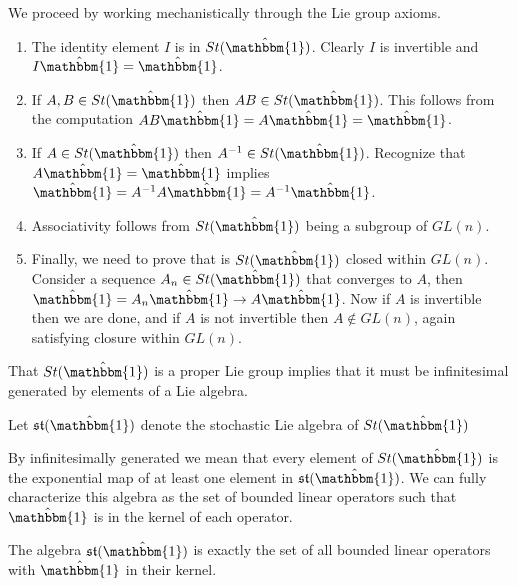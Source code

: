 \begin{IEEEproof}
	We proceed by working mechanistically through the Lie group axioms\cite{hall_lie_2004}.
	\begin{enumerate}
		\item The identity element $I$ is in $St(\hat{\mathbbm{1}})$. Clearly $I$ is
		invertible and $I \hat{\mathbbm{1}} = \hat{\mathbbm{1}}$.
		\item If $A,B \in St(\hat{\mathbbm{1}})$ then $AB \in St(\hat{\mathbbm{1}})$. 
		This follows from the computation $AB \hat{\mathbbm{1}} = A \hat{\mathbbm{1}} = \hat{\mathbbm{1}}$.
		\item If $A \in St(\hat{\mathbbm{1}})$ then $A^{-1} \in St(\hat{\mathbbm{1}})$.
		Recognize that $A \hat{\mathbbm{1}} = \hat{\mathbbm{1}}$ implies $\hat{\mathbbm{1}} = A^{-1} A \hat{\mathbbm{1}} = A^{-1} \hat{\mathbbm{1}}$.
		\item Associativity follows from $St(\hat{\mathbbm{1}})$ being a subgroup of $GL\left(n\right)$.
		\item Finally, we need to prove that is $St(\hat{\mathbbm{1}})$ closed 
		within $GL\left(n\right)$. Consider a sequence $A_n \in St(\hat{\mathbbm{1}})$ 
		that converges to $A$, then $\hat{\mathbbm{1}} = A_n \hat{\mathbbm{1}} \rightarrow A \hat{\mathbbm{1}}$. 
		Now if $A$ is invertible then we are done, and if $A$ is not invertible then 
		$A \notin GL\left(n\right)$, again satisfying closure within $GL\left(n\right)$.\hfill\IEEEQEDhere
	\end{enumerate}
\end{IEEEproof}

That $St(\hat{\mathbbm{1}})$ is a proper Lie group implies that it must be
infinitesimal generated by elements of a Lie algebra.

\begin{definition}
	Let $\mathfrak{st}(\hat{\mathbbm{1}})$ denote the stochastic Lie algebra of $St(\hat{\mathbbm{1}})$
\end{definition}

By infinitesimally generated we mean that every element of $St(\hat{\mathbbm{1}})$
is the exponential map of at least one element in $\mathfrak{st}(\hat{\mathbbm{1}})$. 
We can fully characterize this algebra as the set of bounded linear operators 
such that $\hat{\mathbbm{1}}$ is in the kernel of each operator.

\begin{lemma}
	The algebra $\mathfrak{st}(\hat{\mathbbm{1}})$ is exactly the set of all 
	bounded linear operators with $\hat{\mathbbm{1}}$ in their kernel.
\end{lemma}

